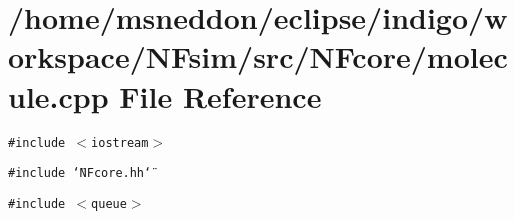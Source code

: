 \section{/home/msneddon/eclipse/indigo/workspace/NFsim/src/NFcore/molecule.cpp File Reference}
\label{molecule_8cpp}


{\tt \#include $<$iostream$>$}\par
{\tt \#include \char`\"{}NFcore.hh\char`\"{}}\par
{\tt \#include $<$queue$>$}\par
